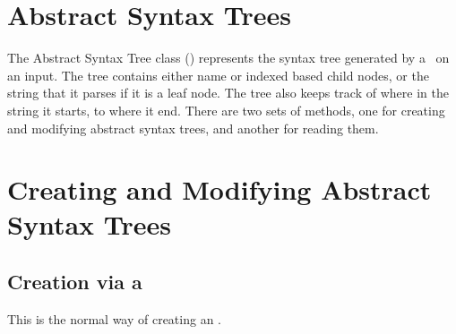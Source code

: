 %
%
%
%
\section{Abstract Syntax Trees}
The Abstract Syntax Tree class (\AST) represents the syntax tree generated by a \grammar\ on an input.
    The tree contains either name or indexed based child nodes, or the string that it parses if it is a leaf node.
    The tree also keeps track of where in the string it starts, to where it end.
    There are two sets of methods, one for creating and modifying abstract syntax trees, and another for reading them.

\section{Creating and Modifying Abstract Syntax Trees}

\subsection{Creation via a \Grammar}
This is the normal way of creating an \AST.

